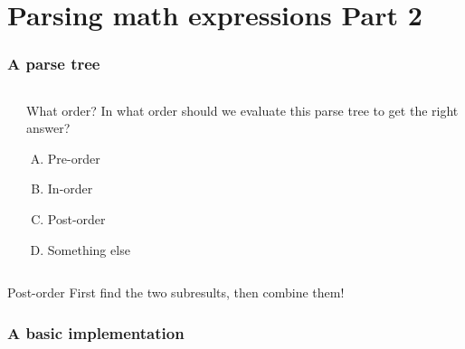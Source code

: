 \section{Parsing math expressions Part 2}
\label{sec:parsing_math_expressions}

\begin{frame}
	\frametitle{A parse tree}
	\begin{columns}
  \\
		\begin{questionblock}{What order?}
			In what order should we evaluate this parse tree to get the right answer?
			\begin{enumerate}[A.]
				\item Pre-order
				\item In-order
				\item Post-order
				\item Something else
			\end{enumerate}
		\end{questionblock}
	\end{columns}
	\pause
	\begin{answerblock}{Post-order}
		First find the two subresults, then combine them!
	\end{answerblock}
\end{frame}

\begin{frame}
	\frametitle{A basic implementation}
	
	
\end{frame}

